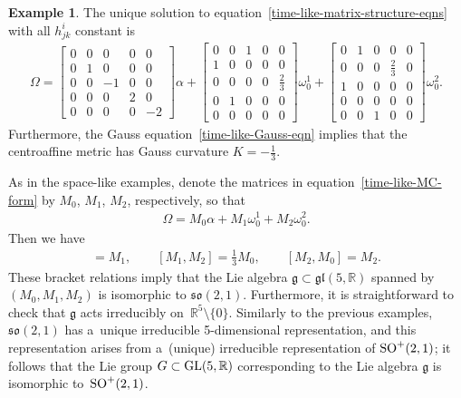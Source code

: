 \documentclass[pdftex]{sigma}
\numberwithin{equation}{section}
\theoremstyle{definition}
\newtheorem{exmpl}[teo]{Example}
\begin{document}
\begin{exmpl}
\label{time-like-example}
The unique solution to equation~\eqref{time-like-matrix-structure-eqns} with all $h^i_{jk}$ constant is
\begin{gather}
\Omega =
\begin{bmatrix}
0 & 0 & 0 & 0 & 0
\\
0 & 1 & 0 & 0 & 0
\\
0 & 0 & -1 & 0 & 0
\\
0 & 0 & 0 & 2 & 0
\\
0 & 0 & 0 & 0 & -2
\end{bmatrix}
\alpha +
\begin{bmatrix}
0 & 0 & 1 & 0 & 0
\\
1 & 0 & 0 & 0 & 0
\\
0 & 0 & 0 & 0 & \tfrac{2}{3}
\\
0 & 1 & 0 & 0 & 0
\\
0 & 0 & 0 & 0 & 0
\end{bmatrix}
\omega^1_0 +
\begin{bmatrix}
0 & 1 & 0 & 0 & 0
\\
0 & 0 & 0 & \tfrac{2}{3} & 0
\\
1 & 0 & 0 & 0 & 0
\\
0 & 0 & 0 & 0 & 0
\\
0 & 0 & 1 & 0 & 0
\end{bmatrix}
\omega^2_0.
\label{time-like-MC-form}
\end{gather}
Furthermore, the Gauss equation~\eqref{time-like-Gauss-eqn} implies that the centroaf\/f\/ine metric has Gauss curvature $K =
-\tfrac{1}{3}$.

As in the space-like examples, denote the matrices in equation~\eqref{time-like-MC-form} by $M_0$, $M_1$, $M_2$, respectively,
so that
\begin{gather*}
\Omega = M_0 \alpha + M_1  \omega^1_0 + M_2  \omega^2_0.
\end{gather*}
Then we have
\begin{gather*}
[M_0, M_1] = M_1,
\qquad
[M_1, M_2] = \tfrac{1}{3} M_0,
\qquad
[M_2, M_0] = M_2.
\end{gather*}
These bracket relations imply that the Lie algebra $\mathfrak{g} \subset \mathfrak{gl}(5,\mathbb{R})$ spanned by $(M_0,
M_1, M_2)$ is isomorphic to $\mathfrak{so}(2,1)$.
Furthermore, it is straightforward to check that $\mathfrak{g}$ acts irreducibly on~$\mathbb{R}^5 \setminus \{0 \}$.
Similarly to the previous examples, $\mathfrak{so}(2,1)$ has a~unique irreducible 5-dimensional representation, and this
representation arises from a~(unique) irreducible representation of ${\rm SO}^+(2,1)$; it follows that the Lie group $G
\subset {\rm GL}(5,\mathbb{R})$ corresponding to the Lie algebra $\mathfrak{g}$ is isomorphic to~${\rm SO}^+(2,1)$.


\end{exmpl}
\end{document}
